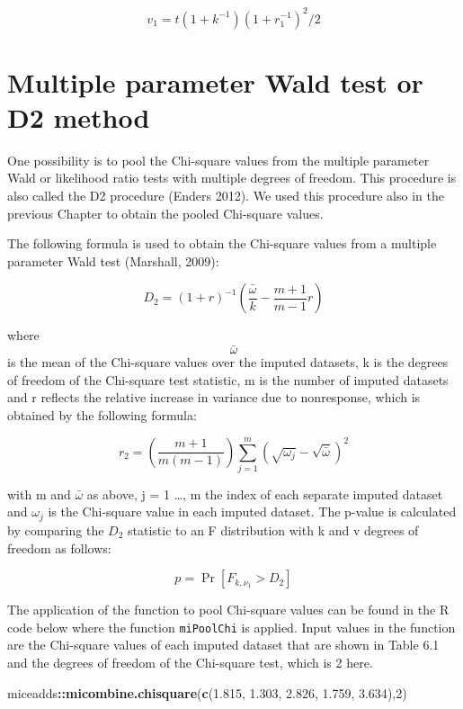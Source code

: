\documentclass[
]{book}
\newenvironment{Shaded}{\begin{snugshade}}{\end{snugshade}}
\newcommand{\DecValTok}[1]{\textcolor[rgb]{0.00,0.00,0.81}{#1}}
\newcommand{\FloatTok}[1]{\textcolor[rgb]{0.00,0.00,0.81}{#1}}
\newcommand{\KeywordTok}[1]{\textcolor[rgb]{0.13,0.29,0.53}{\textbf{#1}}}
\newcommand{\NormalTok}[1]{#1}
\newcommand{\OperatorTok}[1]{\textcolor[rgb]{0.81,0.36,0.00}{\textbf{#1}}}
\begin{document}
\begin{equation}
v_1 = t(1+k^{-1})(1+r_1^{-1})^2/2 
\label{eq:v1b}
\end{equation}

\hypertarget{multiple-parameter-wald-test-or-d2-method}{%
\section{Multiple parameter Wald test or D2 method}\label{multiple-parameter-wald-test-or-d2-method}}

One possibility is to pool the Chi-square values from the multiple parameter Wald or likelihood ratio tests with multiple degrees of freedom. This procedure is also called the D2 procedure (Enders 2012). We used this procedure also in the previous Chapter to obtain the pooled Chi-square values.

The following formula is used to obtain the Chi-square values from a multiple parameter Wald test (Marshall, 2009):

\begin{equation}
 D_2 = (1+r)^{-1} (\frac{ \bar\omega}{k}-\frac{ m+1}{m-1}r)
  \label{eq:d2}
\end{equation}

where \[\bar\omega\] is the mean of the Chi-square values over the imputed datasets, k is the degrees of freedom of the Chi-square test statistic, m is the number of imputed datasets and r reflects the relative increase in variance due to nonresponse, which is obtained by the following formula:

\[r_2 = \left(\frac{m+1}{m(m-1)}\right)\sum_{j=1}^m\left(\sqrt{\omega_j}-{\sqrt{\bar\omega}}\right)^2\]

with m and \(\bar\omega\) as above, j = 1 \ldots, m the index of each separate imputed dataset and \(\omega_j\) is the Chi-square value in each imputed dataset. The p-value is calculated by comparing the \(D_2\) statistic to an F distribution with k and v degrees of freedom as follows:

\[p = \Pr[F_{k,\nu_1}>D_2]\]

The application of the function to pool Chi-square values can be found in the R code below where the function \texttt{miPoolChi} is applied. Input values in the function are the Chi-square values of each imputed dataset that are shown in Table 6.1 and the degrees of freedom of the Chi-square test, which is 2 here.

\begin{Shaded}
\begin{Highlighting}[]
\NormalTok{miceadds}\OperatorTok{::}\KeywordTok{micombine.chisquare}\NormalTok{(}\KeywordTok{c}\NormalTok{(}\FloatTok{1.815}\NormalTok{,}
            \FloatTok{1.303}\NormalTok{,}
            \FloatTok{2.826}\NormalTok{,}
            \FloatTok{1.759}\NormalTok{,}
            \FloatTok{3.634}\NormalTok{),}\DecValTok{2}\NormalTok{)}
\end{Highlighting}
\end{Shaded}
\end{document}
